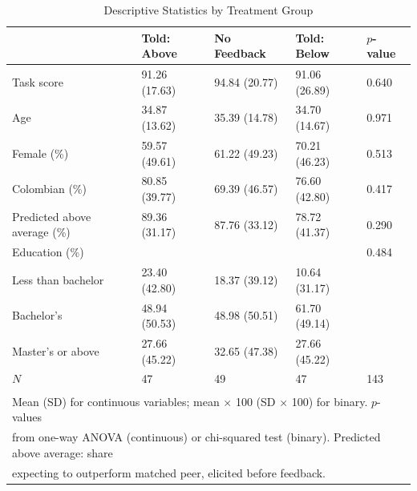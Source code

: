 \begin{table}[!h]
\centering
\caption{Descriptive Statistics by Treatment Group \label{tab:balance}}
\centering
\begin{tabular}[t]{lllll}
\toprule
 & Told: Above & No Feedback & Told: Below & $p$-value\\
\midrule
Task score & 91.26 (17.63) & 94.84 (20.77) & 91.06 (26.89) & 0.640\\
Age & 34.87 (13.62) & 35.39 (14.78) & 34.70 (14.67) & 0.971\\
Female (\%) & 59.57 (49.61) & 61.22 (49.23) & 70.21 (46.23) & 0.513\\
Colombian (\%) & 80.85 (39.77) & 69.39 (46.57) & 76.60 (42.80) & 0.417\\
Predicted above average (\%) & 89.36 (31.17) & 87.76 (33.12) & 78.72 (41.37) & 0.290\\
\addlinespace
Education (\%) &  &  &  & 0.484\\
\quad Less than bachelor & 23.40 (42.80) & 18.37 (39.12) & 10.64 (31.17) & \\
\quad Bachelor's & 48.94 (50.53) & 48.98 (50.51) & 61.70 (49.14) & \\
\quad Master's or above & 27.66 (45.22) & 32.65 (47.38) & 27.66 (45.22) & \\
$N$ & 47 & 49 & 47 & 143\\
\bottomrule
\multicolumn{5}{l}{\textsuperscript{} Mean (SD) for continuous variables; mean $\times$ 100 (SD $\times$ 100) for binary. $p$-values}\\
\multicolumn{5}{l}{from one-way ANOVA (continuous) or chi-squared test (binary). Predicted above average: share}\\
\multicolumn{5}{l}{expecting to outperform matched peer, elicited before feedback.}\\
\end{tabular}
\end{table}
